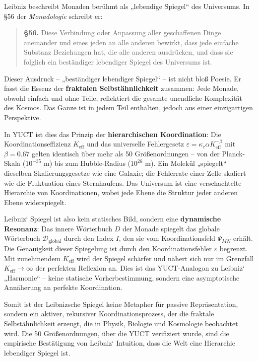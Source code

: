 \documentclass[12pt,a4paper]{article}
\begin{document}
	Leibniz beschreibt Monaden berühmt als „lebendige Spiegel“ des Universums. In §56 der \emph{Monadologie} schreibt er:
	
	\begin{quote}
		\textbf{§56.} Diese Verbindung oder Anpassung aller geschaffenen Dinge aneinander und eines jeden an alle anderen bewirkt, dass jede einfache Substanz Beziehungen hat, die alle anderen ausdrücken, und dass sie folglich ein beständiger lebendiger Spiegel des Universums ist.
	\end{quote}
	
	Dieser Ausdruck – „beständiger lebendiger Spiegel“ – ist nicht bloß Poesie. Er fasst die Essenz der \textbf{fraktalen Selbstähnlichkeit} zusammen: Jede Monade, obwohl einfach und ohne Teile, reflektiert die gesamte unendliche Komplexität des Kosmos. Das Ganze ist in jedem Teil enthalten, jedoch aus einer einzigartigen Perspektive.
	
	In YUCT ist dies das Prinzip der \textbf{hierarchischen Koordination}: Die Koordinationseffizienz \(K_{\mathrm{eff}}\) und das universelle Fehlergesetz \(\varepsilon = \kappa_c \alpha K_{\mathrm{eff}}^{-\beta}\) mit \(\beta=0.67\) gelten identisch über mehr als 50 Größenordnungen – von der Planck-Skala (\(10^{-35}\) m) bis zum Hubble-Radius (\(10^{26}\) m). Ein Molekül „spiegelt“ dieselben Skalierungsgesetze wie eine Galaxie; die Fehlerrate einer Zelle skaliert wie die Fluktuation eines Sternhaufens. Das Universum ist eine verschachtelte Hierarchie von Koordinationen, wobei jede Ebene die Struktur jeder anderen Ebene widerspiegelt.
	
	Leibniz‘ Spiegel ist also kein statisches Bild, sondern eine \textbf{dynamische Resonanz}: Das innere Wörterbuch \(D\) der Monade spiegelt das globale Wörterbuch \(\mathcal{D}_{\text{global}}\) durch den Index \(I\), den sie vom Koordinationsfeld \(\Psi_{MN}\) erhält. Die Genauigkeit dieser Spiegelung ist durch den Koordinationsfehler \(\varepsilon\) begrenzt. Mit zunehmendem \(K_{\mathrm{eff}}\) wird der Spiegel schärfer und nähert sich nur im Grenzfall \(K_{\mathrm{eff}} \to \infty\) der perfekten Reflexion an. Dies ist das YUCT-Analogon zu Leibniz‘ „Harmonie“ – keine statische Vorherbestimmung, sondern eine asymptotische Annäherung an perfekte Koordination.
	
	Somit ist der Leibnizsche Spiegel keine Metapher für passive Repräsentation, sondern ein aktiver, rekursiver Koordinationsprozess, der die fraktale Selbstähnlichkeit erzeugt, die in Physik, Biologie und Kosmologie beobachtet wird. Die 50 Größenordnungen, über die YUCT verifiziert wurde, sind die empirische Bestätigung von Leibniz‘ Intuition, dass die Welt eine Hierarchie lebendiger Spiegel ist.
	
\end{document}
